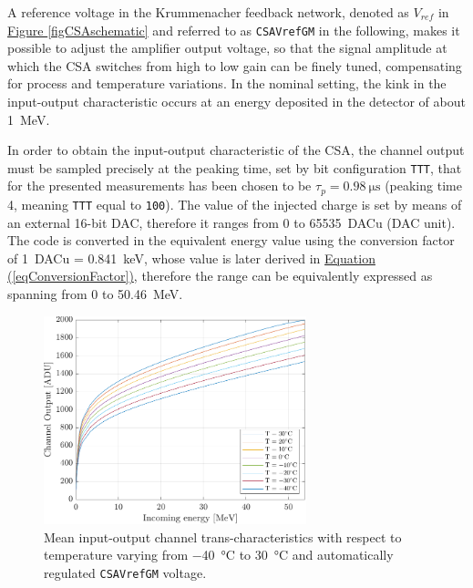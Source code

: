 \par
A reference voltage in the Krummenacher feedback network, denoted as $V_{ref}$ in \hyperref[figCSAschematic]{Figure \ref{figCSAschematic}} and referred to as \texttt{CSAVrefGM} in the following, makes it possible to adjust the amplifier output voltage, so that the signal amplitude at which the CSA switches from high to low gain can be finely tuned, compensating for process and temperature variations. In the nominal setting, the kink in the input-output characteristic occurs at an energy deposited in the detector of about \SI{1}{\mega\electronvolt}.

\par
In order to obtain the input-output characteristic of the CSA, the channel output must be sampled precisely at the peaking time, set by bit configuration \texttt{TTT}, that for the presented measurements has been chosen to be $\tau_{p} = \SI{0.98}{\micro\second}$ (peaking time 4, meaning \texttt{TTT} equal to \texttt{100}). The value of the injected charge is set by means of an external 16-bit DAC, therefore it ranges from 0 to \SI{65535}{DACu} (DAC unit). The code is converted in the equivalent energy value using the conversion factor of \SI{1}{DACu} = \SI{0.841}{\kilo\electronvolt}, whose value is later derived in \hyperref[eqConversionFactor]{Equation (\ref{eqConversionFactor})}, therefore the range can be equivalently expressed as spanning from 0 to \SI{50.46}{\mega\electronvolt}.

\begin{figure}[h!]
    \centering
    \includegraphics[width=0.68\textwidth]{Images/chap1/results/FDT/fdt_csavrefgm_auto_tau6_keV_0011.pdf}
    \caption{Mean input-output channel trans-characteristics with respect to temperature varying from \SI{-40}{\celsius} to \SI{30}{\celsius} and automatically regulated \texttt{CSAVrefGM} voltage.}
    \label{figFDTplotauto0011}
\end{figure}

